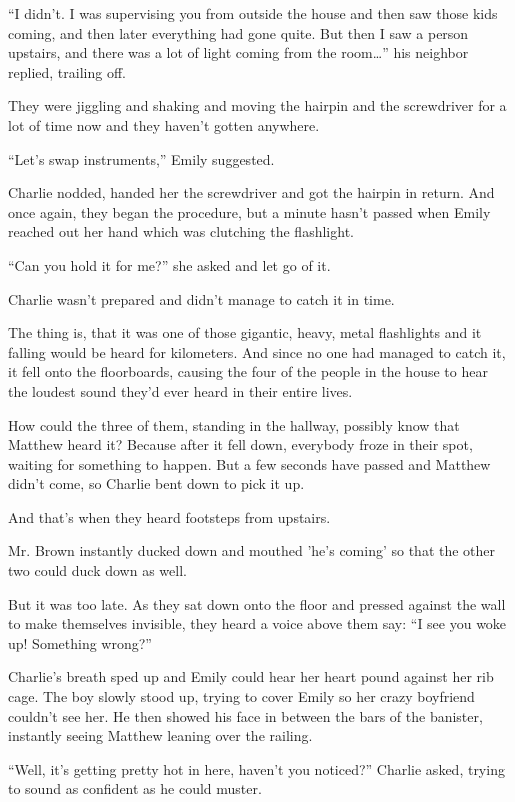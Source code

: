“I didn't. I was supervising you from outside the house and then saw those kids coming, and then later everything had gone quite. But then I saw a person upstairs, and there was a lot of light coming from the room…” his neighbor replied, trailing off.

They were jiggling and shaking and moving the hairpin and the screwdriver for a lot of time now and they haven't gotten anywhere.

“Let's swap instruments,” Emily suggested.

Charlie nodded, handed her the screwdriver and got the hairpin in return. And once again, they began the procedure, but a minute hasn't passed when Emily reached out her hand which was clutching the flashlight.

“Can you hold it for me?” she asked and let go of it.

Charlie wasn't prepared and didn't manage to catch it in time.

The thing is, that it was one of those gigantic, heavy, metal flashlights and it falling would be heard for kilometers. And since no one had managed to catch it, it fell onto the floorboards, causing the four of the people in the house to hear the loudest sound they'd ever heard in their entire lives.

How could the three of them, standing in the hallway, possibly know that Matthew heard it? Because after it fell down, everybody froze in their spot, waiting for something to happen. But a few seconds have passed and Matthew didn't come, so Charlie bent down to pick it up.

And that's when they heard footsteps from upstairs.

Mr. Brown instantly ducked down and mouthed 'he's coming' so that the other two could duck down as well.

But it was too late. As they sat down onto the floor and pressed against the wall to make themselves invisible, they heard a voice above them say:
“I see you woke up! Something wrong?”

Charlie's breath sped up and Emily could hear her heart pound against her rib cage. The boy slowly stood up, trying to cover Emily so her crazy boyfriend couldn't see her. He then showed his face in between the bars of the banister, instantly seeing Matthew leaning over the railing.

“Well, it's getting pretty hot in here, haven't you noticed?” Charlie asked, trying to sound as confident as he could muster.

